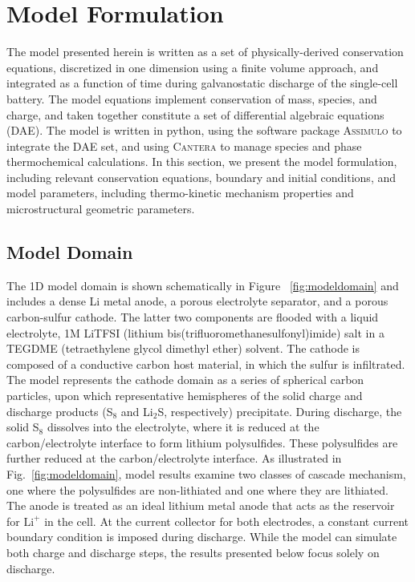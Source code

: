 \documentclass{elsarticle}
\begin{document}
\section{Model Formulation}
The model presented herein is written as a set of physically-derived conservation equations, discretized in one dimension using a finite volume approach, and integrated as a function of time during galvanostatic discharge of the single-cell battery.  The model equations implement conservation of mass, species, and charge, and taken together constitute a set of differential algebraic equations (DAE).  The model is written in python, using the software package \textsc{Assimulo} \cite{assimulo} to integrate the DAE set, and using \textsc{Cantera} \cite{cantera} to manage species and phase thermochemical calculations. In this section, we present the model formulation, including relevant conservation equations, boundary and initial conditions, and model parameters, including thermo-kinetic mechanism properties and microstructural geometric parameters.

\subsection{Model Domain}
The 1D model domain is shown schematically in Figure ~\ref{fig:modeldomain} and includes a dense Li metal anode, a porous electrolyte separator, and a porous carbon-sulfur cathode. The latter two components are flooded with a liquid electrolyte, 1M LiTFSI (lithium bis(trifluoromethanesulfonyl)imide) salt in a TEGDME (tetraethylene glycol dimethyl ether) solvent.  The cathode is composed of a conductive carbon host material, in which the sulfur is infiltrated.~\cite{BRUCKNER201482} The model represents the cathode domain as a series of spherical carbon particles, upon which representative hemispheres of the solid charge and discharge products (S$_8$ and Li$_2$S, respectively) precipitate. During discharge, the solid S$_8$ dissolves into the electrolyte, where it is reduced at the carbon/electrolyte interface to form lithium polysulfides. These polysulfides are further reduced at the carbon/electrolyte interface. As illustrated in Fig.~\ref{fig:modeldomain}, model results examine two classes of cascade mechanism, one where the polysulfides are non-lithiated and one where they are lithiated. The anode is treated as an ideal lithium metal anode that acts as the reservoir for $\mathrm{Li}^+$ in the cell. At the current collector for both electrodes, a constant current boundary condition is imposed during discharge. While the model can simulate both charge and discharge steps, the results presented below focus solely on discharge.
\end{document}
